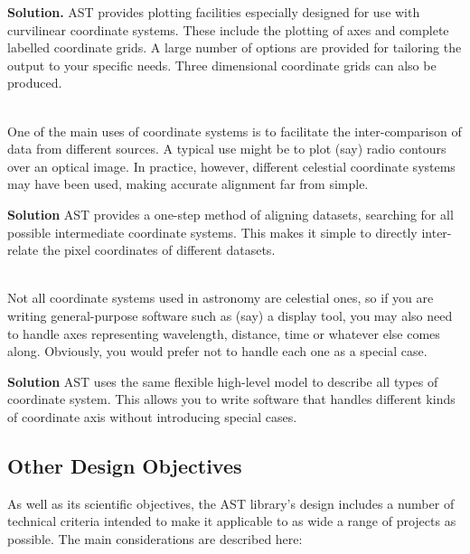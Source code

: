 \documentclass[twoside,11pt]{starlink}
\begin{document}
\begin{description}
\textbf{Solution.} AST provides plotting facilities especially designed
for use with curvilinear coordinate systems. These include the
plotting of axes and complete labelled coordinate grids.  A large
number of options are provided for tailoring the output to your
specific needs. Three dimensional coordinate grids can also be produced.

\item[4. Aligning Data from Different Sources]\mbox{}\\
One of the main uses of coordinate systems is to facilitate the
inter-comparison of data from different sources. A typical use might
be to plot (say) radio contours over an optical image.  In practice,
however, different celestial coordinate systems may have been used,
making accurate alignment far from simple.

\textbf{Solution} AST provides a one-step method of aligning datasets,
searching for all possible intermediate coordinate systems.  This
makes it simple to directly inter-relate the pixel coordinates of
different datasets.

\item[5. Handling Different Types of Coordinate System]\mbox{}\\
Not all coordinate systems used in astronomy are celestial ones, so if
you are writing general-purpose software such as (say) a display tool,
you may also need to handle axes representing wavelength, distance,
time or whatever else comes along. Obviously, you would prefer not to
handle each one as a special case.

\textbf{Solution} AST uses the same flexible high-level model to
describe all types of coordinate system. This allows you to write
software that handles different kinds of coordinate axis without
introducing special cases.
\end{description}

\subsection{Other Design Objectives}

As well as its scientific objectives, the AST library's design
includes a number of technical criteria intended to make it applicable
to as wide a range of projects as possible. The main considerations
are described here:
\end{document}
